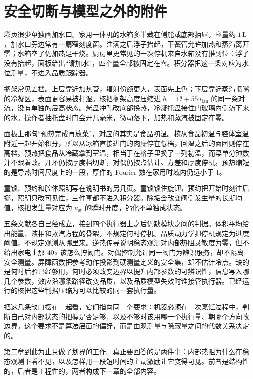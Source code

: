 \section{安全切断与模型之外的附件}

彩页很少单独画加水口。家用一体机的水箱多半藏在侧舱或底部抽屉，容量约 \(1\,\mathrm{L}\)，加水口旁边常有一扇窄刻度窗。注满之后浮子抬起，干簧管允许加热和蒸汽离开零；水箱空了仍加热是干烧。厨房里更常见的一次停机来自水箱没有推到位：浮子没有抬起，面板给出“请加水”，四个量全部被固定在零。积分器把这一条对应为水位测量，不进入品质跟踪器。

搁架常见五档。上层靠近加热管，辐射份额更大，表面先上色；下层靠近蒸汽喷嘴的冷凝区，表面更容易被打湿。核把搁架高度压缩进 \(h=12+55u_{\mathrm{fan}}\) 的同一条对流，没有单独的层高状态。烤盘冲孔改底部换热，冷凝托盘接住门玻璃内侧流下来的水。操作者抽托盘时门会开几毫米，微动落下，加热和蒸汽被固定在零。

面板上那句“预热完成再放菜”，对应的其实是食品初温。核从食品初温与腔体室温附近一起开始积分，所以从冰箱直接进门的肉糜停在低档，回温之后的面团则停在高档。预热把食品从冷藏拿到室温，相当于在格子里换了一列初温，而菜单分钟数并不跟着改。开环仍按厚度档切断，对偶仍按点估计、方差和厚度停机。预热缩短的是导热时间尺度上的一段，厚件的 Fourier 数在家用时域内仍远小于 \(1\)。

童锁、预约和腔体照明写在说明书的另几页。童锁锁住旋钮，预约把开始时刻往后挪，照明只改可见性，三件事都不进入积分器。除垢会改变阀侧发生量的长期均值，核把发生量对应为 \(u_{\mathrm{st}}\) 的瞬时开度，钙化不单独成状态。

五条文献各自已经成立，接到四个执行器上之后仍缺模块之间的判据。体积平均给出能量、液相和蒸汽方程的骨架，不规定何时停机。品质动力学把停机规定为进度阈值，不规定观测从哪里来。逆热传导说明稳态观测对内部热阻灵敏度为零，但不给出家电上那 \(40\,\mathrm{s}\) 该怎么拧阀门。对偶控制允许同一阀门为辨识服务，却不隔离安全测量。屏障函数把参考动作投影到硬测量定义的安全集，却不估计冷点。缺的是何时后验已经够用，何时必须改变边界以提升内部参数的可辨识性，信息写入哪几个参数，效应沿哪条路径改变品质，以及品质模型失效时谁接管执行器。已经运行的核把这些判据压缩为可以比较的同一套执行量。

把这几条缺口摆在一起看，它们指向同一个要求：机器必须在一次烹饪过程中，判断自己对内部状态的把握是否足够，以及不够时该用哪一个执行量、朝哪个方向改边界。这个要求不是算法层面的偏好，而是由观测量与隐藏量之间的代数关系决定的。

第二章到此为止只做了划界的工作。真正要回答的是两件事：内部热阻为什么在稳态观测下看不见，以及怎样用一段短时间的主动激励让它变得可见。前者是结构性的，后者是工程性的，两者构成下一章的全部内容。

